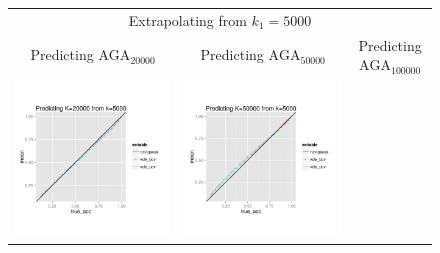 \documentclass[twoside,11pt]{article}
\newenvironment{myfont}{\fontfamily{phv}\selectfont}{\par}
\begin{document}
\begin{figure}
\begin{tabular}{ccc}
\multicolumn{3}{c}{\begin{myfont}Extrapolating from $k_1 = 5000$\end{myfont}}\\
\begin{myfont}Predicting $\text{AGA}_{20000}$\end{myfont} &
\begin{myfont}Predicting $\text{AGA}_{50000}$\end{myfont} &
\begin{myfont}Predicting $\text{AGA}_{100000}$\end{myfont}\\
\includegraphics[scale = 0.45, clip = true, trim = .0in 0 1.25in 1.03in]{sim_large7_bias_K20_k5.png} &
\includegraphics[scale = 0.45, clip = true, trim = .5in 0 1.25in 1.03in]{sim_large7_bias_K50_k5.png} &

\end{tabular}
\end{figure}
\end{document}
